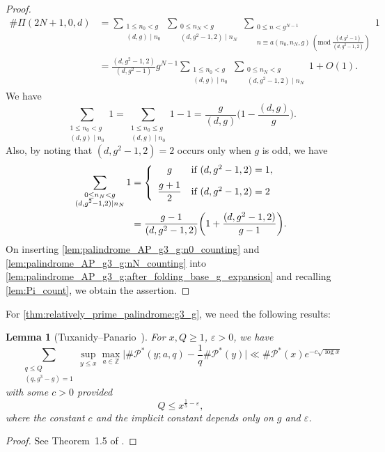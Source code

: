 \documentclass{amsart}
\theoremstyle{plain}
\newtheorem{lemma}[theorem]{Lemma}
\theoremstyle{definition}
\let\tmp\phi
\let\phi\varphi
\let\varphi\tmp
\let\tmp\epsilon
\let\epsilon\varepsilon
\let\varepsilon\tmp
\renewcommand{\mod}[1]{(\mathrm{mod}\ #1)}
\begin{document}
\begin{proof}
\begin{equation}
\begin{aligned}
\#\Pi(2N+1,0,d)
&=
\sum_{\substack{
1\le n_{0}<g\\
(d,g)\mid n_{0}
}}
\sum_{\substack{
0\le n_{N}<g\\
(d,g^{2}-1,2)\mid n_{N}
}}
\sum_{\substack{
0\le n<g^{N-1}\\
n
\equiv
a(n_{0},n_{N},g)
\ \mod{\frac{(d,g^{2}-1)}{(d,g^{2}-1,2)}}
}}
1\\
&=
\frac{(d,g^{2}-1,2)}{(d,g^{2}-1)}g^{N-1}
\sum_{\substack{
1\le n_{0}<g\\
(d,g)\mid n_{0}
}}
\sum_{\substack{
0\le n_{N}<g\\
(d,g^{2}-1,2)\mid n_{N}
}}
1
+
O(1).
\end{aligned}
\end{equation}
We have
\begin{equation}
\label{lem:palindrome_AP_g3_g:n0_counting}
\sum_{\substack{
1\le n_{0}<g\\
(d,g)\mid n_{0}
}}
1
=
\sum_{\substack{
1\le n_{0}\le g\\
(d,g)\mid n_{0}
}}
1
-1
=
\frac{g}{(d,g)}
\biggl(1-\frac{(d,g)}{g}\biggr).
\end{equation}
Also, by noting that $(d,g^{2}-1,2)=2$ occurs only when $g$ is odd, we have
\begin{equation}
\label{lem:palindrome_AP_g3_g:nN_counting}
\begin{aligned}
\sum_{\substack{
0\le n_{N}<g\\
(d,g^{2}-1,2)\mid n_{N}
}}
1
&=
\left\{
\begin{array}{>{\displaystyle}cl}
g&\text{if $(d,g^{2}-1,2)=1$},\\[2mm]
\frac{g+1}{2}&\text{if $(d,g^{2}-1,2)=2$}
\end{array}
\right.\\
&=
\frac{g-1}{(d,g^{2}-1,2)}
\biggl(1+\frac{(d,g^{2}-1,2)}{g-1}\biggr).
\end{aligned}
\end{equation}
On inserting \cref{lem:palindrome_AP_g3_g:n0_counting}
and \cref{lem:palindrome_AP_g3_g:nN_counting}
into \cref{lem:palindrome_AP_g3_g:after_folding_base_g_expansion}
and recalling \cref{lem:Pi_count},
we obtain the assertion.
\end{proof}

For \cref{thm:relatively_prime_palindrome:g3_g},
we need the following results:
\begin{lemma}[{Tuxanidy--Panario~\cite{TuxanidyPanario}}]
\label{lem:TuxanidyPanario_BV}
For $x,Q\ge1$, $\epsilon>0$, we have
\[
\sum_{\substack{
q\le Q\\
(q,g^{3}-g)=1
}}
\sup_{y\le x}
\max_{a\in\mathbb{Z}}
\biggl|
\#\mathscr{P}^{\ast}(y;a,q)
-
\frac{1}{q}\#\mathscr{P}^{\ast}(y)
\biggr|
\ll
\#\mathscr{P}^{\ast}(x)
e^{-c\sqrt{\log x}}
\]
with some $c>0$ provided
\[
Q\le x^{\frac{1}{5}-\epsilon},
\]
where the constant $c$ and the implicit constant depends only on $g$ and $\epsilon$.
\end{lemma}
\begin{proof}
See Theorem~1.5 of \cite{TuxanidyPanario}.
\end{proof}
\end{document}
